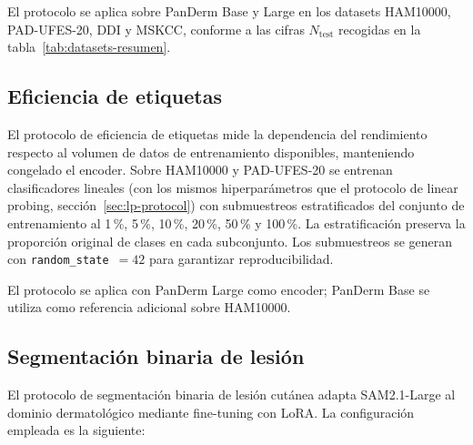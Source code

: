 El protocolo se aplica sobre PanDerm Base y Large en los datasets
HAM10000, PAD-UFES-20, DDI y MSKCC, conforme a las cifras
$N_{\mathrm{test}}$ recogidas en la
tabla~\ref{tab:datasets-resumen}.

\subsection{Eficiencia de etiquetas}
\label{sec:label-eff-protocol}

El protocolo de eficiencia de etiquetas mide la dependencia del
rendimiento respecto al volumen de datos de entrenamiento
disponibles, manteniendo congelado el encoder. Sobre HAM10000 y
PAD-UFES-20 se entrenan clasificadores lineales (con los mismos
hiperparámetros que el protocolo de linear probing,
sección~\ref{sec:lp-protocol}) con submuestreos estratificados del
conjunto de entrenamiento al 1\,\%, 5\,\%, 10\,\%, 20\,\%, 50\,\%
y 100\,\%. La estratificación preserva la proporción original de
clases en cada subconjunto. Los submuestreos se generan con
\texttt{random\_state}~$=42$ para garantizar reproducibilidad.

El protocolo se aplica con PanDerm Large como encoder; PanDerm
Base se utiliza como referencia adicional sobre HAM10000.

\subsection{Segmentación binaria de lesión}
\label{sec:seg-protocol}

El protocolo de segmentación binaria de lesión cutánea adapta
SAM2.1-Large al dominio dermatológico mediante fine-tuning con
LoRA. La configuración empleada es la siguiente:

